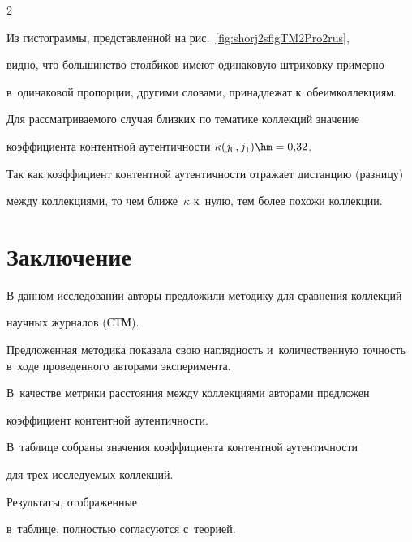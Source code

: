 \begin{multicols}{2}
    


    Из гистограммы, представленной на рис.~\ref{fig:shorj2sfigTM2Pro2rus}, 


видно, что большинство столбиков имеют оди\-на\-ковую штриховку примерно 


в~одинаковой про\-порции, другими словами, принадлежат к~обеим\linebreak коллекциям.


    Для рассматриваемого случая близких по тематике коллекций значение 


коэффициента контентной аутентичности   $\kappa (j_0,j_1) \hm= 0{,}32$.


    Так как коэффициент контентной аутентичности отражает дистанцию (разницу) 


между коллекциями, то чем ближе~$\kappa$  к~нулю, тем более похожи коллекции.


    


    \section{Заключение}


    


    В данном исследовании авторы предложили методику для сравнения коллекций 


научных журналов (СТМ).


    Предложенная методика показала свою наглядность и~количественную точность в~ходе проведенного авторами эксперимента.


    В~качестве мет\-ри\-ки расстояния между коллекциями авторами предложен 


коэффициент контентной аутен\-тич\-ности.


    В~таблице собраны значения коэффициента контентной аутентичности 


для трех исследуемых коллекций.


        Результаты, отображенные 


        в~таблице, пол\-ностью согласуются с~тео\-рией.


        


        \vspace*{3pt}


        





\end{multicols}
